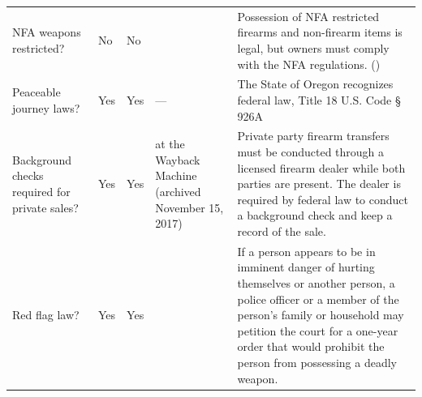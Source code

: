 \documentclass{article}
\begin{document}
\begin{tabular}{lllll}
NFA weapons restricted? & No & No &  & Possession of NFA restricted firearms and non-firearm items is legal, but owners must comply with the NFA regulations. () \\
Peaceable journey laws? & Yes & Yes & --- & The State of Oregon recognizes federal law, Title 18 U.S. Code § 926A \\
Background checks required for private sales? & Yes & Yes & at the Wayback Machine (archived November 15, 2017) & Private party firearm transfers must be conducted through a licensed firearm dealer while both parties are present. The dealer is required by federal law to conduct a background check and keep a record of the sale. \\
Red flag law? & Yes & Yes &  & If a person appears to be in imminent danger of hurting themselves or another person, a police officer or a member of the person's family or household may petition the court for a one-year order that would prohibit the person from possessing a deadly weapon. \\
\bottomrule
\end{tabular}
\end{document}
